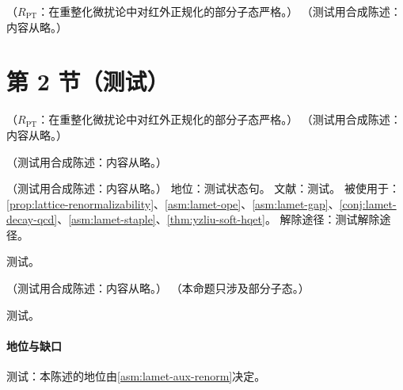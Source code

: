 \begin{proposition}\label{prop:lamet-support}
（$R_{\mathrm{PT}}$：在重整化微扰论中对红外正规化的部分子态严格。）
（测试用合成陈述：内容从略。）
\end{proposition}

\section{第 2 节（测试）}\label{sec:lamet-principle}

\begin{corollary}\label{cor:lamet-entire}
（$R_{\mathrm{PT}}$：在重整化微扰论中对红外正规化的部分子态严格。）
（测试用合成陈述：内容从略。）
\end{corollary}

\begin{example}\label{ex:lattice-quasi-tree}
（测试用合成陈述：内容从略。）
\end{example}

\begin{assumption}\label{asm:lamet-aux-renorm}
（测试用合成陈述：内容从略。）
地位：测试状态句。
文献：测试。
被使用于：\cref{prop:lattice-renormalizability}、\cref{asm:lamet-ope}、\cref{asm:lamet-gap}、\cref{conj:lamet-decay-qcd}、\cref{asm:lamet-staple}、\cref{thm:yzliu-soft-hqet}。
解除途径：测试解除途径。
\end{assumption}
\begin{proofsketch}测试。\end{proofsketch}

\begin{proposition}\label{prop:lattice-renormalizability}
（测试用合成陈述：内容从略。）
（本命题只涉及部分子态。）
\end{proposition}
\begin{proofsketch}测试。\end{proofsketch}
\paragraph{地位与缺口}测试：本陈述的地位由\cref{asm:lamet-aux-renorm}决定。

